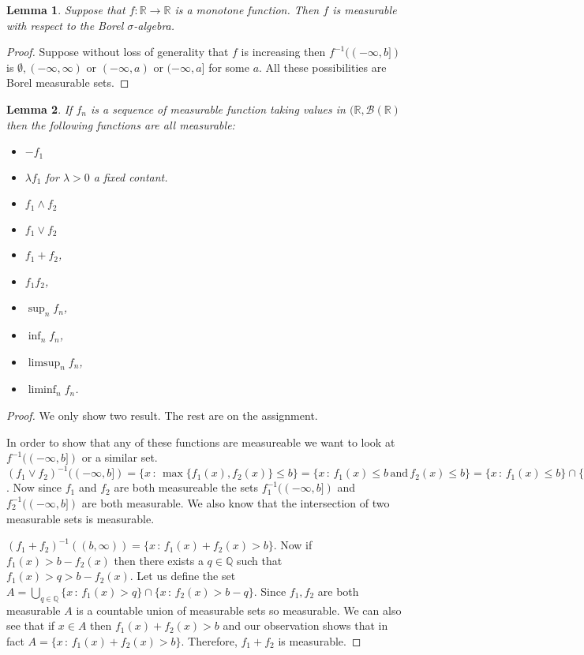 \documentclass[
]{book}
\providecommand{\tightlist}{%
  \setlength{\itemsep}{0pt}\setlength{\parskip}{0pt}}
\newtheorem{lemma}{Lemma}[chapter]
\theoremstyle{definition}
\theoremstyle{definition}
\theoremstyle{definition}
\theoremstyle{definition}
\theoremstyle{remark}
\begin{document}
\begin{lemma}
Suppose that \(f: \mathbb{R} \rightarrow \mathbb{R}\) is a monotone function. Then \(f\) is measurable with respect to the Borel \(\sigma\)-algebra.
\end{lemma}

\begin{proof}
Suppose without loss of generality that \(f\) is increasing then \(f^{-1}((-\infty, b])\) is \(\emptyset, (-\infty, \infty)\) or \((-\infty, a)\) or \((-\infty, a]\) for some \(a\). All these possibilities are Borel measurable sets.
\end{proof}

\begin{lemma}

If \(f_n\) is a sequence of measurable function taking values in \((\mathbb{R}, \mathcal{B}(\mathbb{R})\) then the following functions are all measurable:

\begin{itemize}
\tightlist
\item
  \(-f_1\)
\item
  \(\lambda f_1\) for \(\lambda >0\) a fixed contant.
\item
  \(f_1 \wedge f_2\)
\item
  \(f_1 \vee f_2\)
\item
  \(f_1+f_2\),
\item
  \(f_1 f_2\),
\item
  \(\sup_n f_n\),
\item
  \(\inf_n f_n\),
\item
  \(\limsup_n f_n\),
\item
  \(\liminf_n f_n\).
\end{itemize}

\end{lemma}

\begin{proof}
We only show two result. The rest are on the assignment.

In order to show that any of these functions are measureable we want to look at \(f^{-1}((-\infty, b])\) or a similar set. \((f_1 \vee f_2)^{-1}((-\infty, b]) = \{ x \,:\, \max\{f_1(x), f_2(x)\} \leq b\} = \{ x \,:\, f_1(x) \leq b \, \mbox{and} \, f_2(x) \leq b\} = \{ x \,:\, f_1(x) \leq b \} \cap \{x \,:\, f_2(x) \leq b\} = f_1^{-1}((-\infty, b]) \cap f_2^{-1}((-\infty, b])\). Now since \(f_1\) and \(f_2\) are both measureable the sets \(f_1^{-1}((-\infty, b])\) and \(f_2^{-1}((-\infty, b])\) are both measurable. We also know that the intersection of two measurable sets is measurable.

\((f_1+f_2)^{-1}((b,\infty)) = \{ x \,:\, f_1(x) + f_2(x) > b \}\). Now if \(f_1(x) > b-f_2(x)\) then there exists a \(q \in \mathbb{Q}\) such that \(f_1(x)> q > b - f_2(x)\). Let us define the set \(A= \bigcup_{q \in \mathbb{Q}} \{ x \,:\, f_1(x) > q\} \cap \{ x\,:\, f_2(x) > b-q\}\). Since \(f_1,f_2\) are both measurable \(A\) is a countable union of measurable sets so measurable. We can also see that if \(x \in A\) then \(f_1(x) + f_2(x) > b\) and our observation shows that in fact \(A= \{ x \,:\, f_1(x) + f_2(x) > b \}\). Therefore, \(f_1+f_2\) is measurable.
\end{proof}
\end{document}
